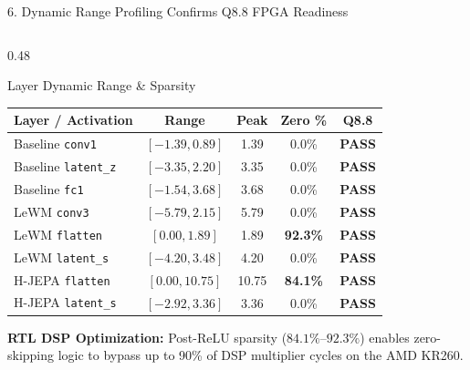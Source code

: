 \documentclass[aspectratio=169, 10pt]{beamer}
\begin{document}
\begin{frame}{6. Dynamic Range Profiling Confirms Q8.8 FPGA Readiness}
\begin{columns}[T]
    \begin{column}{0.48\textwidth}
      \begin{block}{Layer Dynamic Range \& Sparsity}
        \scriptsize
        \centering
        \setlength{\tabcolsep}{2pt}
        \begin{tabular}{lcccc}
          \toprule
          \textbf{Layer / Activation} & \textbf{Range} & \textbf{Peak} & \textbf{Zero \%} & \textbf{Q8.8} \\
          \midrule
          Baseline \texttt{conv1} & $[-1.39, 0.89]$ & 1.39 & 0.0\% & \textbf{PASS} \\
          Baseline \texttt{latent\_z} & $[-3.35, 2.20]$ & 3.35 & 0.0\% & \textbf{PASS} \\
          Baseline \texttt{fc1} & $[-1.54, 3.68]$ & 3.68 & 0.0\% & \textbf{PASS} \\
          LeWM \texttt{conv3} & $[-5.79, 2.15]$ & 5.79 & 0.0\% & \textbf{PASS} \\
          LeWM \texttt{flatten} & $[0.00, 1.89]$ & 1.89 & \textbf{92.3\%} & \textbf{PASS} \\
          LeWM \texttt{latent\_s} & $[-4.20, 3.48]$ & 4.20 & 0.0\% & \textbf{PASS} \\
          H-JEPA \texttt{flatten} & $[0.00, 10.75]$ & 10.75 & \textbf{84.1\%} & \textbf{PASS} \\
          H-JEPA \texttt{latent\_s} & $[-2.92, 3.36]$ & 3.36 & 0.0\% & \textbf{PASS} \\
          \bottomrule
        \end{tabular}
      \end{block}
      \vspace{0.05cm}
      \scriptsize \textbf{RTL DSP Optimization:} Post-ReLU sparsity ($\mathbf{84.1\%}$--$\mathbf{92.3\%}$) enables zero-skipping logic to bypass up to 90\% of DSP multiplier cycles on the AMD KR260.
    \end{column}
  \end{columns}
\end{frame}
\end{document}
